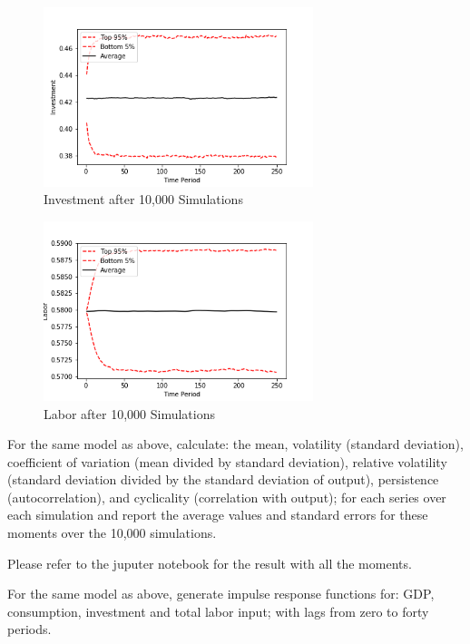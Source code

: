\documentclass[letterpaper,11pt]{article}
\theoremstyle{definition}
\begin{document}
\begin{spacing}{1.5}
	\begin{figure}[H]
		\caption{Investment after 10,000 Simulations}
		\label{fig:investment_10000}
		\includegraphics[width=0.7\textwidth]{investment.png}
	\end{figure}

	\begin{figure}[H]
		\caption{Labor after 10,000 Simulations}
		\label{fig:labor_10000}
		\includegraphics[width=0.7\textwidth]{labor.png}
	\end{figure}

	\begin{Exercise} \label{Linear_HW_Base_Moments}
		For the same model as above, calculate: the mean, volatility (standard deviation), coefficient of variation (mean divided by standard deviation), relative volatility (standard deviation divided by the standard deviation of output), persistence (autocorrelation), and cyclicality (correlation with output); for each series over each simulation and report the average values and standard errors for these moments over the 10,000 simulations.
	\end{Exercise}

	Please refer to the juputer notebook for the result with all the moments.

	\begin{Exercise} \label{Linear_HW_Base_IRFs}
		For the same model as above, generate impulse response functions for: GDP, consumption, investment and total labor input; with lags from zero to forty periods.
	\end{Exercise}


\end{spacing}
\end{document}
